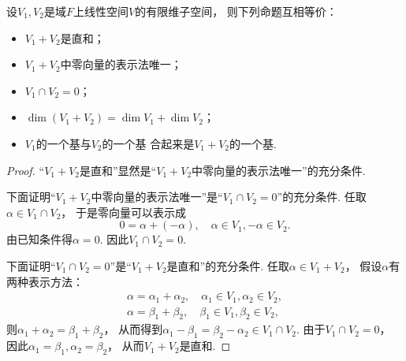 \begin{theorem}\label{theorem:线性空间.子空间.直和的等价命题}
设\(V_1,V_2\)是域\(F\)上线性空间\(V\)的有限维子空间，
则下列命题互相等价：\begin{itemize}
	\item \(V_1+V_2\)是直和；
	\item \(V_1+V_2\)中零向量的表示法唯一；
	\item \(V_1 \cap V_2=0\)；
	\item \(\dim(V_1+V_2)=\dim V_1+\dim V_2\)；
	\item \(V_1\)的一个基与\(V_2\)的一个基 合起来是\(V_1+V_2\)的一个基.
\end{itemize}
\begin{proof}
“\(V_1+V_2\)是直和”显然是“\(V_1+V_2\)中零向量的表示法唯一”的充分条件.

下面证明“\(V_1+V_2\)中零向量的表示法唯一”是“\(V_1 \cap V_2=0\)”的充分条件.
任取\(\alpha \in V_1 \cap V_2\)，
于是零向量可以表示成\begin{equation*}
	0 = \alpha + (-\alpha),
	\quad
	\alpha \in V_1,
	-\alpha \in V_2.
\end{equation*}
由已知条件得\(\alpha = 0\).
因此\(V_1 \cap V_2 = 0\).

下面证明“\(V_1 \cap V_2=0\)”是“\(V_1+V_2\)是直和”的充分条件.
任取\(\alpha \in V_1 + V_2\)，
假设\(\alpha\)有两种表示方法：\begin{gather*}
	\alpha = \alpha_1 + \alpha_2,
	\quad \alpha_1 \in V_1,
	\alpha_2 \in V_2, \\
	\alpha = \beta_1 + \beta_2,
	\quad \beta_1 \in V_1,
	\beta_2 \in V_2,
\end{gather*}
则\(\alpha_1 + \alpha_2
= \beta_1 + \beta_2\)，
从而得到\(\alpha_1 - \beta_1
= \beta_2 - \alpha_2
\in V_1 \cap V_2\).
由于\(V_1 \cap V_2 = 0\)，
因此\(\alpha_1 = \beta_1,
\alpha_2 = \beta_2\)，
从而\(V_1 + V_2\)是直和.


\end{proof}
\end{theorem}
